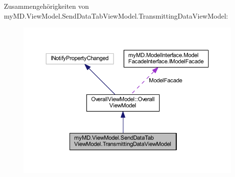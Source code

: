 Zusammengehörigkeiten von my\+M\+D.\+View\+Model.\+Send\+Data\+Tab\+View\+Model.\+Transmitting\+Data\+View\+Model\+:
\nopagebreak
\begin{figure}[H]
\begin{center}
\leavevmode
\includegraphics[width=350pt]{classmy_m_d_1_1_view_model_1_1_send_data_tab_view_model_1_1_transmitting_data_view_model__coll__graph}
\end{center}
\end{figure}
